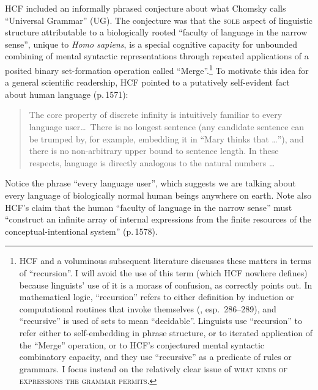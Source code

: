 \documentclass[output=paper,colorlinks,citecolor=brown
]{langscibook}
\begin{document}
HCF included an informally phrased conjecture about what Chomsky calls
``Universal Grammar'' (UG). The conjecture was that the \textsc{sole}
aspect of linguistic structure attributable to a biologically rooted
``faculty of language in the narrow sense'', unique to \textit{Homo sapiens},
is a special cognitive capacity for unbounded combining of mental
syntactic representations through repeated applications of a posited
binary set-formation operation called ``Merge''.\footnote{%
   HCF and a voluminous subsequent literature discusses these matters
   in terms of ``recursion''. I will avoid the use of this term (which
   HCF nowhere defines) because linguists' use of it is a morass of
   confusion, as \citet{Lobina14} correctly points out. In mathematical
   logic, ``recursion'' refers to either definition by induction or
   computational routines that invoke themselves (\citealt{Soare96},
   esp.\ 286--289), and ``recursive'' is used of sets to mean ``decidable''.
   Linguists use ``recursion'' to refer either to self-embedding in
   phrase structure, or to iterated application of the ``Merge''
   operation, or to HCF's conjectured mental syntactic combinatory
   capacity, and they use ``recursive'' as a predicate of rules or
   grammars. I focus instead on the relatively clear issue of
   \textsc{what kinds of expressions the grammar permits}.}
To motivate this idea for a general scientific readership, HCF pointed
to a putatively self-evident fact about human language (p.\,1571):

\begin{quote}
The core property of discrete infinity is intuitively familiar to every
language user\ldots\ There is no longest sentence (any candidate sentence
can be trumped by, for example, embedding it in ``Mary thinks that \ldots''),
and there is no non-arbitrary upper bound to sentence length. In these
respects, language is directly analogous to the natural numbers \ldots
\end{quote}
Notice the phrase ``every language user'', which suggests we are talking
about every language of biologically normal human beings anywhere on
earth. Note also HCF's claim that the human ``faculty of language in the
narrow sense'' must ``construct an infinite array of internal expressions
from the finite resources of the conceptual-intentional system'' (p.\,1578).
\end{document}
